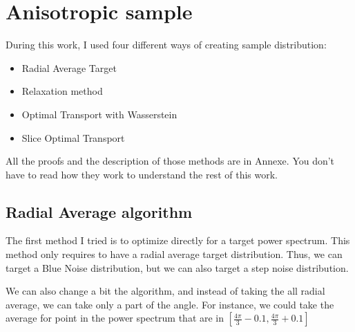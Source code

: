 \documentclass{classeENS}
\begin{document}
\section{Anisotropic sample}

During this work, I used four different ways of creating sample distribution:
\begin{itemize}
    \item Radial Average Target
    \item Relaxation method
    \item Optimal Transport with Wasserstein
    \item Slice Optimal Transport 
\end{itemize}
All the proofs and the description of those methods are in Annexe. 
You don't have to read how they work to understand the rest of this work.

\subsection{Radial Average algorithm}
    The first method I tried is to optimize directly for a target power spectrum.
    This method only requires to have a radial average target distribution. Thus, we can
    target a Blue Noise distribution, but we can also target a step noise distribution.
    
    We can also change a bit the algorithm, and instead of taking the all radial average,
    we can take only a part of the angle. For instance, we could take the average for
    point in the power spectrum that are in $[\frac{4\pi}{3} - 0.1, \frac{4\pi}{3}+0.1]$
    
\end{document}
